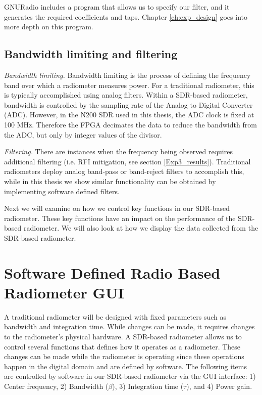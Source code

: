


GNURadio includes a program that allows us to specify our filter, and it generates the required coefficients and taps.  Chapter \ref{ch:exp_design} goes into more depth on this program.

\subsection{Bandwidth limiting and filtering}

\emph{Bandwidth limiting.}  Bandwidth limiting is the process of defining the frequency band over which a radiometer measures power.  For a traditional radiometer, this is typically accomplished using analog filters.  Within a SDR-based radiometer, bandwidth is controlled by the sampling rate of the Analog to Digital Converter (ADC).  However, in the N200 SDR used in this thesis, the ADC clock is fixed at 100 MHz.  Therefore the FPGA decimates the data to reduce the bandwidth from the ADC, but only by integer values of the divisor.

\emph{Filtering.}  There are instances when the frequency being observed requires additional filtering (i.e. RFI mitigation, see section \ref{Exp3_results}).  Traditional radiometers deploy analog band-pass or band-reject filters to accomplish this, while in this thesis we show similar functionality can be obtained by implementing software defined filters.

Next we will examine on how we control key functions in our SDR-based radiometer.  These key functions have an impact on the performance of the SDR-based radiometer.  We will also look at how we display the data collected from the SDR-based radiometer.

\section{Software Defined Radio Based Radiometer GUI}

A traditional radiometer will be designed with fixed parameters such as bandwidth and integration time.  While changes can be made, it requires changes to the radiometer's physical hardware.  A SDR-based radiometer allows us to control several functions that defines how it operates as a radiometer.  These changes can be made while the radiometer is operating since these operations happen in the digital domain and are defined by software. The following items are controlled by software in our SDR-based radiometer via the GUI interface: 1) Center frequency, 2) Bandwidth ($\beta$), 3) Integration time ($\tau$), and 4) Power gain.

